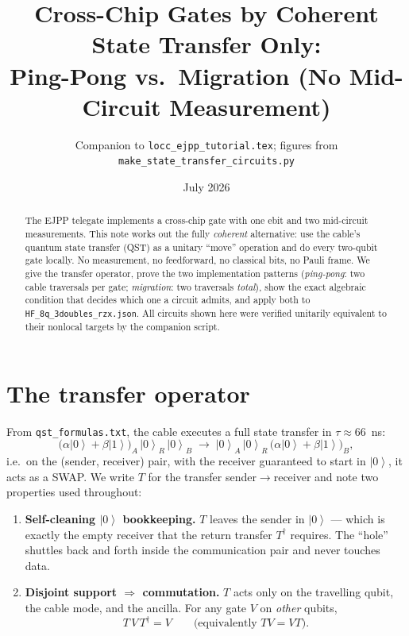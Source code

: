 \documentclass[11pt]{article}
\title{Cross-Chip Gates by Coherent State Transfer Only:\\
Ping-Pong vs.\ Migration (No Mid-Circuit Measurement)}
\author{Companion to \texttt{locc\_ejpp\_tutorial.tex}; figures from
\texttt{make\_state\_transfer\_circuits.py}}
\date{July 2026}
\newcommand{\ket}[1]{\left|#1\right\rangle}
\begin{document}
\maketitle

\begin{abstract}
The EJPP telegate implements a cross-chip gate with one ebit and two
mid-circuit measurements. This note works out the fully \emph{coherent}
alternative: use the cable's quantum state transfer (QST) as a unitary
``move'' operation and do every two-qubit gate locally. No measurement, no
feedforward, no classical bits, no Pauli frame. We give the transfer
operator, prove the two implementation patterns (\emph{ping-pong}: two cable
traversals per gate; \emph{migration}: two traversals \emph{total}), show
the exact algebraic condition that decides which one a circuit admits, and
apply both to \texttt{HF\_8q\_3doubles\_rzx.json}. All circuits shown here
were verified unitarily equivalent to their nonlocal targets by the
companion script.
\end{abstract}

\section{The transfer operator}

From \texttt{qst\_formulas.txt}, the cable executes a full state transfer in
$\tau \approx 66$~ns:
\[
\big(\alpha\ket{0} + \beta\ket{1}\big)_{\!A}\,\ket{0}_R\,\ket{0}_B
\;\longrightarrow\;
\ket{0}_A\,\ket{0}_R\,\big(\alpha\ket{0} + \beta\ket{1}\big)_{\!B},
\]
i.e.\ on the (sender, receiver) pair, with the receiver guaranteed to start
in $\ket{0}$, it acts as a SWAP. We write $T$ for the transfer
sender$\to$receiver and note two properties used throughout:

\begin{enumerate}[leftmargin=2em]
  \item \textbf{Self-cleaning $\ket{0}$ bookkeeping.} $T$ leaves the sender
        in $\ket{0}$ --- which is exactly the empty receiver that the return
        transfer $T^{\dagger}$ requires. The ``hole'' shuttles back and
        forth inside the communication pair and never touches data.
  \item \textbf{Disjoint support $\Rightarrow$ commutation.} $T$ acts only on
        the travelling qubit, the cable mode, and the ancilla. For any gate
        $V$ on \emph{other} qubits,
        \[
        T\,V\,T^{\dagger} = V
        \qquad\text{(equivalently } TV = VT\text{).}
        \]
\end{enumerate}
\end{document}
